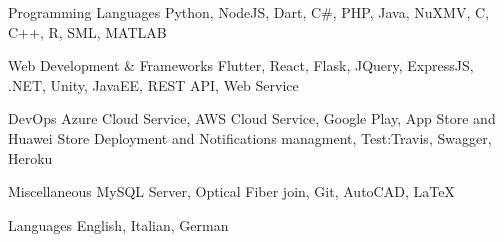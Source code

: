 

\begin{cvskills}

  \cvskill
    {Programming Languages} %
    {Python, NodeJS, Dart, C#, PHP, Java, NuXMV, C, C++, R, SML, MATLAB} %

  \cvskill
    {Web Development \& Frameworks} %
    {Flutter, React, Flask, JQuery, ExpressJS, .NET, Unity, JavaEE, REST API, Web Service} %

  \cvskill
    {DevOps} %
    {Azure Cloud Service, AWS Cloud Service, Google Play, App Store and Huawei Store Deployment and Notifications managment, Test:Travis, Swagger, Heroku} %

  \cvskill
    {Miscellaneous} %
    {MySQL Server, Optical Fiber join, Git, AutoCAD, LaTeX} %

  \cvskill
    {Languages} %
    {English, Italian, German} %

\end{cvskills}

